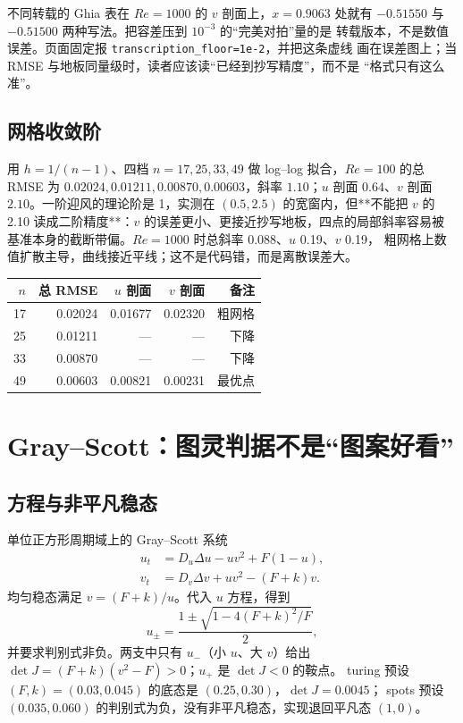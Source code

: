 不同转载的 Ghia 表在 $Re=1000$ 的 $v$ 剖面上，$x=0.9063$ 处就有
$-0.51550$ 与 $-0.51500$ 两种写法。把容差压到 $10^{-3}$ 的“完美对拍”量的是
转载版本，不是数值误差。页面固定报 \texttt{transcription\_floor=1e-2}，并把这条虚线
画在误差图上；当 RMSE 与地板同量级时，读者应该读“已经到抄写精度”，而不是
“格式只有这么准”。

\subsection{网格收敛阶}

用 $h=1/(n-1)$、四档 $n=17,25,33,49$ 做 log--log 拟合，$Re=100$ 的总 RMSE
为 $0.02024,0.01211,0.00870,0.00603$，斜率 $1.10$；$u$ 剖面 $0.64$、$v$ 剖面
$2.10$。一阶迎风的理论阶是 1，实测在 $(0.5,2.5)$ 的宽窗内，但**不能把 $v$ 的
2.10 读成二阶精度**：$v$ 的误差更小、更接近抄写地板，四点的局部斜率容易被
基准本身的截断带偏。$Re=1000$ 时总斜率 $0.088$、$u$ 0.19、$v$ 0.19，
粗网格上数值扩散主导，曲线接近平线；这不是代码错，而是离散误差大。

\begin{center}
\begin{tabular}{rrrrr}
\toprule
$n$ & 总 RMSE & $u$ 剖面 & $v$ 剖面 & 备注 \\
\midrule
17 & 0.02024 & 0.01677 & 0.02320 & 粗网格 \\
25 & 0.01211 & — & — & 下降 \\
33 & 0.00870 & — & — & 下降 \\
49 & 0.00603 & 0.00821 & 0.00231 & 最优点 \\
\bottomrule
\end{tabular}
\end{center}

\section{Gray--Scott：图灵判据不是“图案好看”}\label{sec:turing}

\subsection{方程与非平凡稳态}

单位正方形周期域上的 Gray--Scott 系统
\begin{align}
  u_t&=D_u\Delta u-uv^2+F(1-u),\\
  v_t&=D_v\Delta v+uv^2-(F+k)v .
\end{align}
均匀稳态满足 $v=(F+k)/u$。代入 $u$ 方程，得到
\[
  u_\pm=\frac{1\pm\sqrt{1-4(F+k)^2/F}}{2},
\]
并要求判别式非负。两支中只有 $u_-$（小 $u$、大 $v$）给出
$\det J=(F+k)(v^2-F)>0$；$u_+$ 是 $\det J<0$ 的鞍点。
turing 预设 $(F,k)=(0.03,0.045)$ 的底态是 $(0.25,0.30)$，$\det J=0.0045$；
spots 预设 $(0.035,0.060)$ 的判别式为负，没有非平凡稳态，实现退回平凡态
$(1,0)$。

